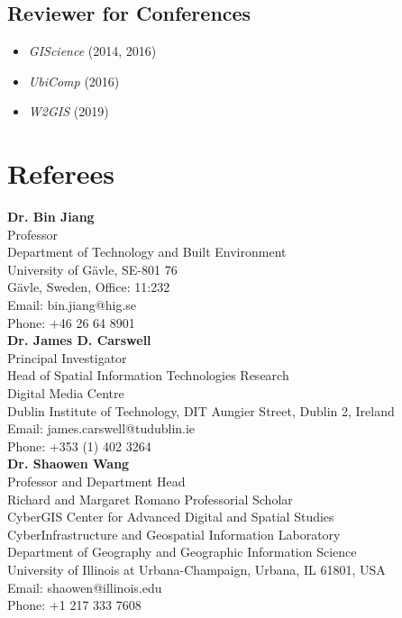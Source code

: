 \documentclass[11pt, a4paper]{article}
\begin{document}
\subsection*{Reviewer for Conferences}
\begin{itemize}
  \setlength\itemsep{0em}
  \item \emph{GIScience} (2014, 2016)
  \item \emph {UbiComp} (2016)
  \item \emph {W2GIS} (2019)
\end{itemize}

\section*{Referees}
\noindent
\textbf{Dr. Bin Jiang}\\
Professor\\
Department of Technology and Built Environment\\
University of Gävle, SE-801 76\\
Gävle, Sweden, Office: 11:232\\
Email: bin.jiang@hig.se\\
Phone: +46 26 64 8901\\

\textbf{Dr. James D. Carswell}\\
Principal Investigator\\
Head of Spatial Information Technologies Research\\
Digital Media Centre\\
Dublin Institute of Technology, DIT Aungier Street, Dublin 2, Ireland\\
Email: james.carswell@tudublin.ie\\
Phone: +353 (1) 402 3264\\

\textbf{Dr. Shaowen Wang}\\
Professor and Department Head\\
Richard and Margaret Romano Professorial Scholar\\
CyberGIS Center for Advanced Digital and Spatial Studies\\
CyberInfrastructure and Geospatial Information Laboratory\\
Department of Geography and Geographic Information Science\\
University of Illinois at Urbana-Champaign, Urbana, IL 61801, USA\\
Email: shaowen@illinois.edu\\
Phone: +1 217 333 7608\\
\end{document}
